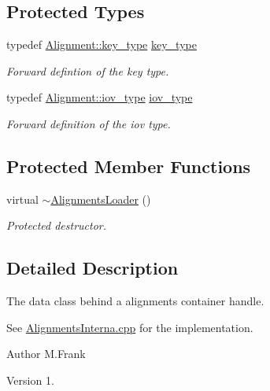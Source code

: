 \subsection*{Protected Types}
\begin{DoxyCompactItemize}
\item 
typedef \hyperlink{class_d_d4hep_1_1_alignments_1_1_alignment_ab824a65f935a0c79b9ea1a7a85014b88}{Alignment\+::key\+\_\+type} \hyperlink{class_d_d4hep_1_1_alignments_1_1_alignments_loader_af56e6294e72dacbe001c1f24b8381d5d}{key\+\_\+type}
\begin{DoxyCompactList}\small\item\em Forward defintion of the key type. \end{DoxyCompactList}\item 
typedef \hyperlink{class_d_d4hep_1_1_alignments_1_1_alignment_afd988c803da5a514d8fa255784f29462}{Alignment\+::iov\+\_\+type} \hyperlink{class_d_d4hep_1_1_alignments_1_1_alignments_loader_a632271e6cb9198528a0826d9082561d1}{iov\+\_\+type}
\begin{DoxyCompactList}\small\item\em Forward definition of the iov type. \end{DoxyCompactList}\end{DoxyCompactItemize}
\subsection*{Protected Member Functions}
\begin{DoxyCompactItemize}
\item 
virtual \hyperlink{class_d_d4hep_1_1_alignments_1_1_alignments_loader_af2ad650d826e5656254929ae956ee2ef}{$\sim$\+Alignments\+Loader} ()
\begin{DoxyCompactList}\small\item\em Protected destructor. \end{DoxyCompactList}\end{DoxyCompactItemize}


\subsection{Detailed Description}
The data class behind a alignments container handle. 

See \hyperlink{_alignments_interna_8cpp}{Alignments\+Interna.\+cpp} for the implementation.

\begin{DoxyAuthor}{Author}
M.\+Frank 
\end{DoxyAuthor}
\begin{DoxyVersion}{Version}
1. 
\end{DoxyVersion}


